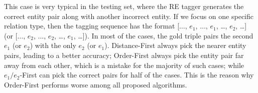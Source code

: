 This case is very typical in the testing set, where the RE tagger generates
the correct entity pair along with another incorrect entity. 
If we focus on one specific relation type, then the tagging sequence has the format
[$\dots$, $e_1$, $\dots$, $e_1$, \dots, $e_2$, \dots]
(or [$\dots$, $e_2$, $\dots$, $e_2$, \dots, $e_1$, \dots]).
In most of the cases, the gold triple pairs the second $e_1$ (or $e_2$) with the only $e_2$ (or $e_1$).
Distance-First always pick the nearer entity pairs, leading to a better accuracy;
Order-First always pick the entity pair far away from each other, which is a mistake for the majority of such cases;
while $e_1/e_2$-First can pick the correct pairs for half of the cases.
This is the reason why Order-First performs worse among all proposed algorithms.












